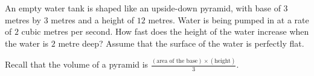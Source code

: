 \documentclass[../main.tex]{subfiles}
\begin{document}
\begin{example}
  An empty water tank is shaped like an upside-down pyramid, with base of \(3\) metres by \(3\) metres and a height of \(12\) metres. Water is being pumped in at a rate of \(2\) cubic metres per second. How fast does the height of the water increase when the water is \(2\) metre deep? Assume that the surface of the water is perfectly flat. 

  Recall that the volume of a pyramid is \(\frac{(\text{area of the base}) \times (\text{height})}{3}\).

\end{example}
\end{document}
